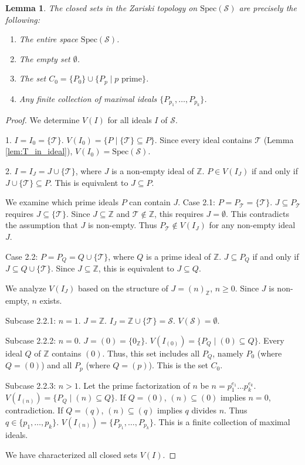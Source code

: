 \documentclass[11pt, a4paper]{article}
\theoremstyle{plain}
\newtheorem{lemma}[theorem]{Lemma}
\theoremstyle{definition}
\numberwithin{equation}{section}
\newcommand{\Z}{\mathbb{Z}}
\newcommand{\Tobj}{\mathcal{T}} %
\newcommand{\SemiringS}{\mathcal{S}}
\newcommand{\Spec}{\mathrm{Spec}}
\begin{document}
\begin{lemma}\label{lem:closed_sets_S}
The closed sets in the Zariski topology on $\Spec(\SemiringS)$ are precisely the following:
\begin{enumerate}
    \item The entire space $\Spec(\SemiringS)$.
    \item The empty set $\emptyset$.
    \item The set $C_0 = \{P_0\} \cup \{P_p \mid p \text{ prime}\}$.
    \item Any finite collection of maximal ideals $\{P_{p_1}, \dots, P_{p_k}\}$.
\end{enumerate}
\end{lemma}
\begin{proof}
We determine $V(I)$ for all ideals $I$ of $\SemiringS$.

1. $I=I_0=\{\Tobj\}$. $V(I_0) = \{P \mid \{\Tobj\} \subseteq P\}$. Since every ideal contains $\Tobj$ (Lemma \ref{lem:T_in_ideal}), $V(I_0) = \Spec(\SemiringS)$.

2. $I=I_J=J\cup\{\Tobj\}$, where $J$ is a non-empty ideal of $\Z$. $P \in V(I_J)$ if and only if $J \cup \{\Tobj\} \subseteq P$. This is equivalent to $J \subseteq P$.

We examine which prime ideals $P$ can contain $J$.
Case 2.1: $P=P_{\Tobj}=\{\Tobj\}$. $J \subseteq P_{\Tobj}$ requires $J \subseteq \{\Tobj\}$. Since $J \subseteq \Z$ and $\Tobj \notin \Z$, this requires $J=\emptyset$. This contradicts the assumption that $J$ is non-empty. Thus $P_{\Tobj} \notin V(I_J)$ for any non-empty ideal $J$.

Case 2.2: $P=P_Q=Q\cup\{\Tobj\}$, where $Q$ is a prime ideal of $\Z$. $J \subseteq P_Q$ if and only if $J \subseteq Q\cup\{\Tobj\}$. Since $J \subseteq \Z$, this is equivalent to $J \subseteq Q$.

We analyze $V(I_J)$ based on the structure of $J=(n)_{\Z}$, $n \ge 0$. Since $J$ is non-empty, $n$ exists.

Subcase 2.2.1: $n=1$. $J=\Z$. $I_J=\Z\cup\{\Tobj\}=\SemiringS$. $V(\SemiringS) = \emptyset$.

Subcase 2.2.2: $n=0$. $J=(0)=\{0_{\Z}\}$. $V(I_{(0)}) = \{P_Q \mid (0) \subseteq Q\}$. Every ideal $Q$ of $\Z$ contains $(0)$. Thus, this set includes all $P_Q$, namely $P_0$ (where $Q=(0)$) and all $P_p$ (where $Q=(p)$). This is the set $C_0$.

Subcase 2.2.3: $n>1$. Let the prime factorization of $n$ be $n=p_1^{e_1}\dots p_k^{e_k}$.
$V(I_{(n)}) = \{P_Q \mid (n) \subseteq Q\}$.
If $Q=(0)$, $(n) \subseteq (0)$ implies $n=0$, contradiction.
If $Q=(q)$, $(n) \subseteq (q)$ implies $q$ divides $n$. Thus $q \in \{p_1, \dots, p_k\}$.
$V(I_{(n)}) = \{P_{p_1}, \dots, P_{p_k}\}$. This is a finite collection of maximal ideals.

We have characterized all closed sets $V(I)$.
\end{proof}
\end{document}
